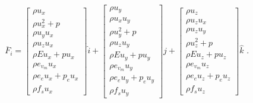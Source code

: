 \begin{equation}
 \overline{F}_{i} = \left [ \begin{array}{c}
                               \rho u_{x} \\
                               \rho u_{x}^{2} + p \\
                               \rho u_{y} u_{x} \\
                               \rho u_{z} u_{x} \\
                               \rho E u_{x} + p u_{x} \\
                               \rho e_{v_{m}} u_{x} \\
                               \rho e_{e} u_{x} + p_{e} u_{x} \\
                               \rho f_{s} u_{x}
                            \end{array} \right ] \hat{i} 
                  + \left [ \begin{array}{c} 
                               \rho u_{y} \\
                               \rho u_{x} u_{y} \\
                               \rho u_{y}^{2} + p \\
                               \rho u_{z} u_{y} \\
                               \rho E u_{y} + p u_{y} \\
                               \rho e_{v_{m}} u_{y} \\
                               \rho e_{e} u_{y} + p_{e} u_{y} \\
                               \rho f_{s} u_{y}
                            \end{array} \right ] \hat{j} 
                  + \left [ \begin{array}{c} 
                               \rho u_{z} \\
                               \rho u_{z} u_{x} \\
                               \rho u_{z} u_{y} \\
                               \rho u_{z}^{2} + p \\
                               \rho E u_{z} + p u_{z} \\
                               \rho e_{v_{m}} u_{z} \\
                               \rho e_{e} u_{z} + p_{e} u_{z} \\
                               \rho f_{s} u_{z}
                            \end{array} \right ] \hat{k} 
                 \text{ . }
 \label{eq:F_i_3D}
\end{equation}
